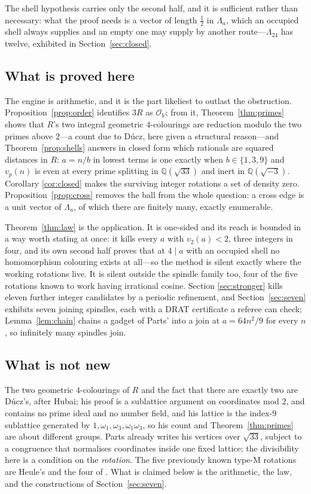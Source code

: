 \documentclass[11pt,reqno]{amsart}
\theoremstyle{plain}
\theoremstyle{definition}
\newcommand{\Q}{\mathbb{Q}}
\newcommand{\Lat}{R}
\newcommand{\Ok}{\mathcal{O}}
\newcommand{\Lam}{\Lambda}
\begin{document}
The shell hypothesis carries only the second half, and it is sufficient rather
than necessary: what the proof needs is a vector of length $\tfrac12$ in
$\Lam_a$, which an occupied shell always supplies and an empty one may supply by
another route---$\Lam_{24}$ has twelve, exhibited in Section~\ref{sec:closed}.

\subsection*{What is proved here}

The engine is arithmetic, and it is the part likeliest to outlast the
obstruction. Proposition~\ref{prop:order} identifies $3\Lat$ as $\Ok_V$; from it,
Theorem~\ref{thm:primes} shows that $\Lat$'s two integral geometric
$4$-colourings are reduction modulo the two primes above $2$---a count due to
Dúcz, here given a structural reason---and Theorem~\ref{prop:shells} answers in
closed form which rationals are squared distances in $\Lat$: $a = n/b$ in lowest
terms is one exactly when $b \in \{1,3,9\}$ and $v_p(n)$ is even at every prime
splitting in $\Q(\sqrt{33})$ and inert in $\Q(\sqrt{-3})$. Corollary
\ref{cor:closed} makes the surviving integer rotations a set of density zero.
Proposition~\ref{prop:cross} removes the ball from the whole question: a cross
edge is a unit vector of $\Lam_a$, of which there are finitely many, exactly
enumerable.

Theorem~\ref{thm:law} is the application. It is one-sided and its reach is
bounded in a way worth stating at once: it kills every $a$ with $v_2(a) < 2$,
three integers in four, and
its own second half proves that at $4 \mid a$ with an occupied shell no
homomorphism colouring exists at all---so the method is silent exactly where the
working rotations live. It is silent outside the spindle family too, four of the
five rotations known to work having irrational cosine. Section
\ref{sec:stronger} kills eleven further integer candidates by a periodic
refinement, and Section~\ref{sec:seven} exhibits seven joining spindles, each
with a DRAT certificate a referee can check; Lemma~\ref{lem:chain} chains a
gadget of Parts' into a join at $a = 64n^2/9$ for every $n$, so infinitely many
spindles join.

\subsection*{What is not new}

The two geometric $4$-colourings of $\Lat$ and the fact that there are exactly
two are Dúcz's, after Hubai; his proof is a sublattice argument on coordinates
mod $2$, and contains no prime ideal and no number field, and his lattice is the
index-$9$ sublattice generated by $1, \omega_1, \omega_3, \omega_1\omega_3$, so
his count and Theorem~\ref{thm:primes} are about different groups. Parts already
writes his vertices over $\sqrt{33}$, subject to a congruence that normalises
coordinates inside one fixed lattice; the divisibility here is a condition on the
\emph{rotation}. The five previously known type-M rotations are Heule's and the
four of \cite{Voronov}. What is claimed below is the arithmetic, the law, and the
constructions of Section~\ref{sec:seven}.
\end{document}
